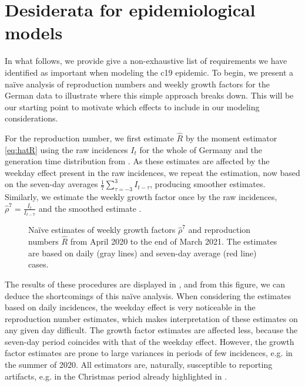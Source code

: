 \section{Desiderata for epidemiological models}
\label{sec:dessiderata}

In what follows, we provide give a non-exhaustive list of requirements we have identified as important when modeling the \acrshort{c19} epidemic. To begin, we present a na\"{i}ve analysis of reproduction numbers and weekly growth factors for the  German data to illustrate where this simple approach breaks down. This will be our starting point to motivate which effects to include in our modeling considerations.

For the reproduction number, we first estimate $\hat R$ by the moment estimator \eqref{eq:hatR} using the raw incidences $I_{t}$ for the whole of Germany and the generation time distribution from . As these estimates are affected by the weekday effect present in the raw incidences, we repeat the estimation, now based on the seven-day averages $\frac{1}{7}\sum_{\tau = -3}^3I_{t - \tau}$, producing smoother estimates. 
Similarly, we estimate the weekly growth factor once by the raw incidences, $ \hat \rho^{7} = \frac{I_{t}}{I_{t - 7}}$ and the smoothed estimate .

\begin{figure}
    \resizebox{\textwidth}{!}{%
    }
    \caption{Na\"{i}ve estimates of weekly growth factors $\hat \rho^{7}$ and reproduction numbers $\hat R$ from April 2020 to the end of March 2021. The estimates are based on daily (gray lines) and seven-day average (red line) cases.}
    \label{fig:rho_and_R_naive}
\end{figure}

The results of these procedures are displayed in , and from this figure, we can deduce the shortcomings of this na\"{i}ve analysis. When considering the estimates based on daily incidences, the weekday effect is very noticeable in the reproduction number estimates, which makes interpretation of these estimates on any given day difficult. The growth factor estimates are affected less, because the seven-day period coincides with that of the weekday effect. However, the growth factor estimates are prone to large variances in periods of few incidences, e.g. in the summer of 2020. All estimators are, naturally, susceptible to reporting artifacts, e.g. in the Christmas period already highlighted in .

